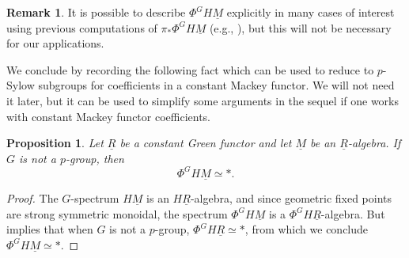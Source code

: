 \documentclass[11pt]{amsart}
\newtheorem{proposition}[equation]{Proposition}
\theoremstyle{definition}
\newtheorem{remark}[equation]{Remark}
\numberwithin{equation}{subsection} %
\def\z{\mathbb{Z}}
\def\uM{\underline{M}}
\def\uR{\underline{R}}
\def\uM{\underline{M}}
\begin{document}
\begin{remark}
It is possible to describe $\Phi^G H\uM$ explicitly in many cases of interest using previous computations of $\pi_*\Phi^G H\uM$ (e.g., \cite{HHR16, Kri20}), but this will not be necessary for our applications. 
\end{remark}





We conclude by recording the following fact which can be used to reduce to $p$-Sylow subgroups for coefficients in a constant Mackey functor. We will not need it later, but it can be used to simplify some arguments in the sequel if one works with constant Mackey functor coefficients. 

\begin{proposition}\label{Prop:GFPVanish}
Let $\uR$ be a constant Green functor and let $\uM$ be an $\uR$-algebra. If $G$ is not a $p$-group, then
$$\Phi^G H\uM \simeq *.$$
\end{proposition}


\begin{proof}
The $G$-spectrum $H\uM$ is an $H\uR$-algebra, and since geometric fixed points are strong symmetric monoidal, the spectrum $\Phi^G H\uM$ is a $\Phi^G H\uR$-algebra. But \cite[Prop. 11]{Kri20} implies that when $G$ is not a $p$-group, $\Phi^G H\uR \simeq *$, from which we conclude $\Phi^G H\uM \simeq *$. 
\end{proof}
\end{document}

